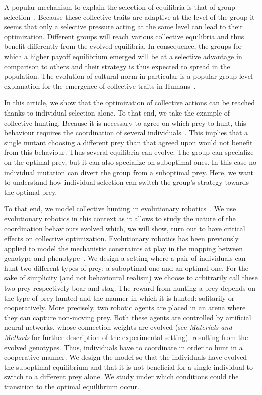   A popular mechanism to explain the selection of equilibria is that of group selection~\parencite{Boyd1990}. Because these collective traits are adaptive at the level of the group it seems that only a selective pressure acting at the same level can lead to their optimization. Different groups will reach various collective equilibria and thus benefit differently from the evolved equilibria. In consequence, the groups for which a higher payoff equilibrium emerged will be at a selective advantage in comparison to others and their strategy is thus expected to spread in the population. The evolution of cultural norm in particular is a popular group-level explanation for the emergence of collective traits in Humans~\parencite{Boyd2002, Binmore2011, Smaldino2014}.

  In this article, we show that the optimization of collective actions can be reached thanks to individual selection alone. To that end, we take the example of collective hunting. Because it is necessary to agree on which prey to hunt, this behaviour requires the coordination of several individuals~\parencite{Alvard2002, Alvard2003, Drea2009a}. This implies that a single mutant choosing a different prey than that agreed upon would not benefit from this behaviour. Thus several equilibria can evolve. The group can specialize on the optimal prey, but it can also specialize on suboptimal ones. In this case no individual mutation can divert the group from a suboptimal prey. Here, we want to understand how individual selection can switch the group's strategy towards the optimal prey.

  To that end, we model collective hunting in evolutionary robotics~\parencite{Nolfi2000, Doncieux2015a}. We use evolutionary robotics in this context as it allows to study the nature of the coordination behaviours evolved which, we will show, turn out to have critical effects on collective optimization. Evolutionary robotics has been previously applied to model the mechanistic constraints at play in the mapping between genotype and phenotype~\parencite{Mitri2013, Trianni2014b, Bernard2016a}. We design a setting where a pair of individuals can hunt two different types of prey: a suboptimal one and an optimal one. For the sake of simplicity (and not behavioural realism) we choose to arbitrarily call these two prey respectively boar and stag. The reward from hunting a prey depends on the type of prey hunted and the manner in which it is hunted: solitarily or cooperatively. More precisely, two robotic agents are placed in an arena where they can capture non-moving prey. Both these agents are controlled by artificial neural networks, whose connection weights are evolved (see \emph{Materials and Methods} for further description of the experimental setting). resulting from the evolved genotypes. Thus, individuals have to coordinate in order to hunt in a cooperative manner. We design the model so that the individuals have evolved the suboptimal equilibrium and that it is not beneficial for a single individual to switch to a different prey alone. We study under which conditions could the transition to the optimal equilibrium occur.

